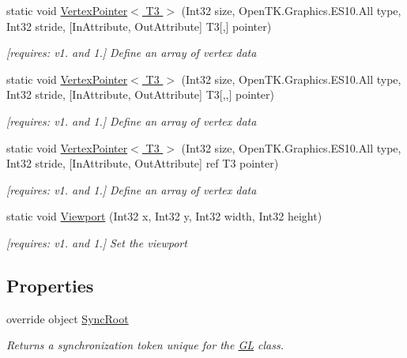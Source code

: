 \begin{DoxyCompactItemize}
static void \hyperlink{class_open_t_k_1_1_graphics_1_1_e_s10_1_1_g_l_a09e8548091dfe01367564ab87025d168}{Vertex\-Pointer$<$ T3 $>$} (Int32 size, Open\-T\-K.\-Graphics.\-E\-S10.\-All type, Int32 stride, \mbox{[}In\-Attribute, Out\-Attribute\mbox{]} T3\mbox{[},\mbox{]} pointer)
\begin{DoxyCompactList}\small\item\em \mbox{[}requires\-: v1. and 1.\mbox{]} Define an array of vertex data \end{DoxyCompactList}\item 
static void \hyperlink{class_open_t_k_1_1_graphics_1_1_e_s10_1_1_g_l_afe57c764a1b93c0355347fac3a475177}{Vertex\-Pointer$<$ T3 $>$} (Int32 size, Open\-T\-K.\-Graphics.\-E\-S10.\-All type, Int32 stride, \mbox{[}In\-Attribute, Out\-Attribute\mbox{]} T3\mbox{[},,\mbox{]} pointer)
\begin{DoxyCompactList}\small\item\em \mbox{[}requires\-: v1. and 1.\mbox{]} Define an array of vertex data \end{DoxyCompactList}\item 
static void \hyperlink{class_open_t_k_1_1_graphics_1_1_e_s10_1_1_g_l_a30b7dda43f10eb2dff4dbb1cebb63d20}{Vertex\-Pointer$<$ T3 $>$} (Int32 size, Open\-T\-K.\-Graphics.\-E\-S10.\-All type, Int32 stride, \mbox{[}In\-Attribute, Out\-Attribute\mbox{]} ref T3 pointer)
\begin{DoxyCompactList}\small\item\em \mbox{[}requires\-: v1. and 1.\mbox{]} Define an array of vertex data \end{DoxyCompactList}\item 
static void \hyperlink{class_open_t_k_1_1_graphics_1_1_e_s10_1_1_g_l_a1eea729a878f1a18a146b1bfc5ebe4e1}{Viewport} (Int32 x, Int32 y, Int32 width, Int32 height)
\begin{DoxyCompactList}\small\item\em \mbox{[}requires\-: v1. and 1.\mbox{]} Set the viewport \end{DoxyCompactList}\end{DoxyCompactItemize}
\subsection*{Properties}
\begin{DoxyCompactItemize}
\item 
override object \hyperlink{class_open_t_k_1_1_graphics_1_1_e_s10_1_1_g_l_a96a1a2fa150951082651b492c29e5aba}{Sync\-Root}
\begin{DoxyCompactList}\small\item\em Returns a synchronization token unique for the \hyperlink{class_open_t_k_1_1_graphics_1_1_e_s10_1_1_g_l}{G\-L} class. \end{DoxyCompactList}\end{DoxyCompactItemize}
